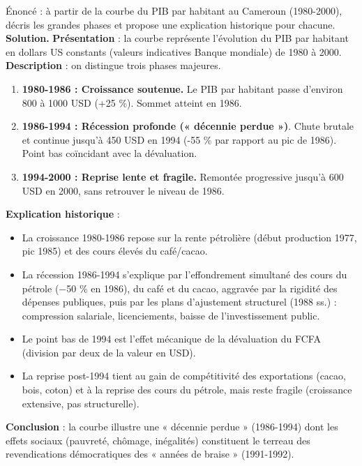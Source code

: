 \documentclass[11pt]{article}
\begin{document}
\begin{exoresolu}
Énoncé : à partir de la courbe du PIB par habitant au Cameroun (1980-2000), décris les grandes phases et propose une explication historique pour chacune.
\tcblower
\textbf{Solution.}
\textbf{Présentation} : la courbe représente l'évolution du PIB par habitant en dollars US constants (valeurs indicatives Banque mondiale) de 1980 à 2000.
\textbf{Description} : on distingue trois phases majeures.
\begin{enumerate}
\item \textbf{1980-1986 : Croissance soutenue.} Le PIB par habitant passe d'environ \num{800} à \num{1000} USD (+25 \%). Sommet atteint en 1986.
\item \textbf{1986-1994 : Récession profonde (« décennie perdue »)}. Chute brutale et continue jusqu'à \num{450} USD en 1994 (-55 \% par rapport au pic de 1986). Point bas coïncidant avec la dévaluation.
\item \textbf{1994-2000 : Reprise lente et fragile.} Remontée progressive jusqu'à \num{600} USD en 2000, sans retrouver le niveau de 1986.
\end{enumerate}
\textbf{Explication historique} :
\begin{itemize}
\item La croissance 1980-1986 repose sur la rente pétrolière (début production 1977, pic 1985) et des cours élevés du café/cacao.
\item La récession 1986-1994 s'explique par l'effondrement simultané des cours du pétrole (\num{-50} \% en 1986), du café et du cacao, aggravée par la rigidité des dépenses publiques, puis par les plans d'ajustement structurel (1988 ss.) : compression salariale, licenciements, baisse de l'investissement public.
\item Le point bas de 1994 est l'effet mécanique de la dévaluation du FCFA (division par deux de la valeur en USD).
\item La reprise post-1994 tient au gain de compétitivité des exportations (cacao, bois, coton) et à la reprise des cours du pétrole, mais reste fragile (croissance extensive, pas structurelle).
\end{itemize}
\textbf{Conclusion} : la courbe illustre une « décennie perdue » (1986-1994) dont les effets sociaux (pauvreté, chômage, inégalités) constituent le terreau des revendications démocratiques des « années de braise » (1991-1992).
\end{exoresolu}
\end{document}
